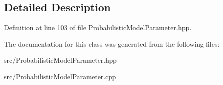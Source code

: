 \subsection{Detailed Description}


Definition at line 103 of file Probabilistic\+Model\+Parameter.\+hpp.



The documentation for this class was generated from the following files\+:\begin{DoxyCompactItemize}
\item 
src/Probabilistic\+Model\+Parameter.\+hpp\item 
src/Probabilistic\+Model\+Parameter.\+cpp\end{DoxyCompactItemize}
